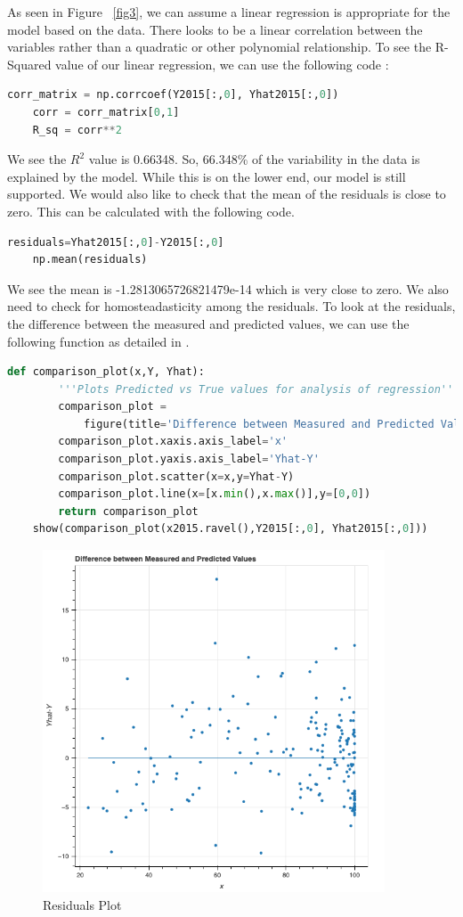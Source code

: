 \documentclass[12pt]{article}
\begin{document}
As seen in Figure ~\ref{fig3}, we can assume a linear regression is appropriate for the model based on the data. There looks to be a linear correlation between the variables rather than a quadratic or other polynomial relationship. To see the R-Squared value of our linear regression, we can use the following code \citep{pythonr2}:
\begin{lstlisting}[language=Python]
    corr_matrix = np.corrcoef(Y2015[:,0], Yhat2015[:,0])
    corr = corr_matrix[0,1]
    R_sq = corr**2
\end{lstlisting}
We see the $R^2$ value is 0.66348. So, 66.348\% of the variability in the data is explained by the model. While this is on the lower end, our model is still supported. We would also like to check that the mean of the residuals is close to zero. This can be calculated with the following code.
\begin{lstlisting}[language=Python]
    residuals=Yhat2015[:,0]-Y2015[:,0]
    np.mean(residuals)
\end{lstlisting}
We see the mean is -1.2813065726821479e-14 which is very close to zero. We also need to check for homosteadasticity among the residuals. To look at the residuals, the difference between the measured and predicted values, we can use the following function as detailed in \citet{teitelbaum2021linreg}.
\begin{lstlisting}[language=Python]
    def comparison_plot(x,Y, Yhat):
        '''Plots Predicted vs True values for analysis of regression'''
        comparison_plot = 
            figure(title='Difference between Measured and Predicted Values')
        comparison_plot.xaxis.axis_label='x'
        comparison_plot.yaxis.axis_label='Yhat-Y'
        comparison_plot.scatter(x=x,y=Yhat-Y)
        comparison_plot.line(x=[x.min(),x.max()],y=[0,0])
        return comparison_plot
    show(comparison_plot(x2015.ravel(),Y2015[:,0], Yhat2015[:,0]))
\end{lstlisting}

\begin{figure}
    \centering
    \includegraphics[width=4in]{Figures/figure3.png}
    \caption{Residuals Plot}
    \label{fig5}
\end{figure}
\end{document}
